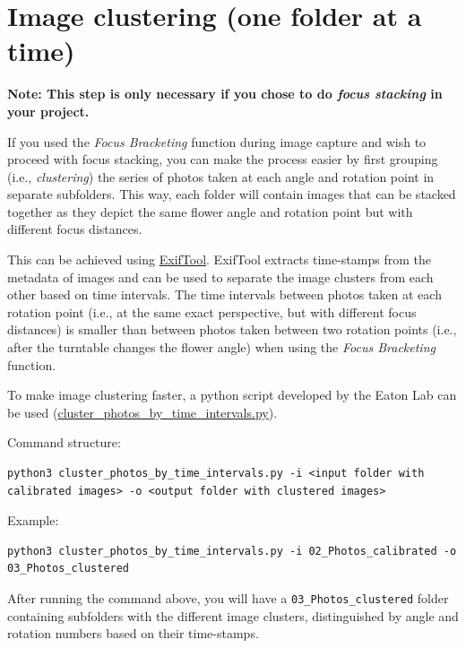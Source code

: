 \documentclass[
]{book}
\begin{document}
\hfill\break

\hypertarget{image-clustering-one-folder-at-a-time}{%
\section{Image clustering (one folder at a time)}\label{image-clustering-one-folder-at-a-time}}

{\textbf{Note: This step is only necessary if you chose to do \emph{focus stacking} in your project.}}

If you used the \emph{Focus Bracketing} function during image capture and wish to proceed
with focus stacking, you can make the process easier by first grouping (i.e., \emph{clustering})
the series of photos taken at each angle and rotation point in separate subfolders. This
way, each folder will contain images that can be stacked together as they depict
the same flower angle and rotation point but with different focus distances.

This can be achieved using \href{https://exiftool.org/}{ExifTool}. ExifTool extracts time-stamps from the metadata
of images and can be used to separate the image clusters from each other based on
time intervals. The time intervals between photos taken at each
rotation point (i.e., at the same exact perspective, but with different focus distances)
is smaller than between photos taken between two rotation points (i.e., after the
turntable changes the flower angle) when using the \emph{Focus Bracketing} function.

To make image clustering faster, a python script developed by the Eaton Lab can be
used (\href{https://github.com/yuemeanshappy/photogram/blob/main/python_scripts/cluster_photos_by_time_intervals.py}{cluster\_photos\_by\_time\_intervals.py}).

Command structure:

\begin{verbatim}
python3 cluster_photos_by_time_intervals.py -i <input folder with calibrated images> -o <output folder with clustered images>
\end{verbatim}

Example:

\begin{verbatim}
python3 cluster_photos_by_time_intervals.py -i 02_Photos_calibrated -o 03_Photos_clustered
\end{verbatim}

After running the command above, you will have a \texttt{03\_Photos\_clustered} folder containing subfolders with the different
image clusters, distinguished by angle and rotation numbers based on their time-stamps.
\end{document}
